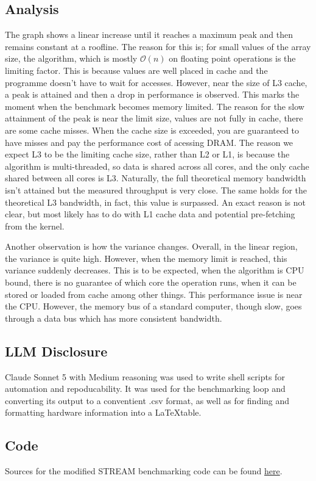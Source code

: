 \documentclass{article}
\newcommand{\includesource}[1]{%
}
\begin{document}
\subsection{Analysis}
The graph shows a linear increase until it reaches a maximum peak and then remains constant at a roofline. The reason for this is; for small values of the array size, the algorithm, which is mostly $\mathcal{O}(n)$ on floating point operations is the limiting factor. This is because values are 
well placed in cache and the programme doesn't have to wait for accesses. However, near the size of L3 cache, a peak is attained and then a drop in performance is observed. This marks the moment when the benchmark becomes memory limited. The reason for the slow attainment of the peak is near the 
limit size, values are not fully in cache, there are some cache misses. When the cache size is exceeded, you are guaranteed to have misses and pay the performance cost of acessing DRAM.
The reason we expect L3 to be the limiting cache size, rather than L2 or L1, is because the algorithm is multi-threaded, so data is shared across all cores, and the only cache shared between all cores is L3. Naturally, the full theoretical memory bandwidth isn't attained but the measured throughput is 
very close. The same holds for the theoretical L3 bandwidth, in fact, this value is surpassed. An exact reason is not clear, but most likely has to do with L1 cache data and potential pre-fetching from the kernel.

Another observation is how the variance changes. Overall, in the linear region, the variance is quite high. However, when the memory limit is reached, this variance suddenly decreases. This is to be expected, when the algorithm is CPU bound, there is no guarantee of which core the operation runs, when it 
can be stored or loaded from cache among other things. This performance issue is near the CPU. However, the memory bus of a standard computer, though slow, goes through a data bus which has more consistent bandwidth.

\subsection{LLM Disclosure}
Claude Sonnet 5 with Medium reasoning was used to write shell scripts for automation and repoducability. It was used for the benchmarking loop and converting its output to a conventient .csv format, as well as for finding and formatting hardware information into a \LaTeX table.

\subsection{Code}
Sources for the modified STREAM benchmarking code can be found \href{https://github.com/ghbouwman/STREAM}{here}.

\includesource{2/mem-info.sh}
\includesource{2/analysis.py}
\end{document}
